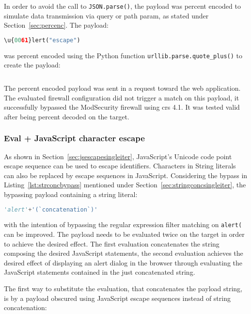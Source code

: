 In order to avoid the call to \verb|JSON.parse()|, the payload was percent encoded to simulate data transmission via query or path param, as stated under Section~\ref{sec:percenc}. The payload:

\begin{lstlisting}[style=basicStyle, escapeinside=\^\^, language=Python]
\u{0061}lert("escape")
\end{lstlisting}
was percent encoded using the Python function \verb|urllib.parse.quote_plus()| to create the payload:

\begin{lstlisting}[style=basicStyle, escapeinside=\^\^, language=Python, caption={\textbackslash u\{0061\}lert("escape") percent encoded bypass}]
%5Cu%7B0061%7Dlert%28%27escape%27%29
\end{lstlisting}
The percent encoded payload was sent in a request toward the web application. The evaluated firewall configuration did not trigger a match on this payload, it successfully bypassed the ModSecurity firewall using \acrshort{crs} 4.1. It was tested valid after being percent decoded on the target.

\subsubsection{Eval + JavaScript character escape}
\label{sec:jsescapemultiiter}
As shown in Section~\ref{sec:jsescapesingleiter}, JavaScript's Unicode code point escape sequence can be used to escape identifiers.
Characters in String literals can also be replaced by escape sequences in JavaScript. Considering the bypass in Listing~\ref{lst:strconcbypass} mentioned under Section~\ref{sec:stringconcsingleiter}, the bypassing payload containing a string literal:

\begin{lstlisting}[style=basicStyle, language=Python]
'alert'+'(`concatenation`)'
\end{lstlisting}
with the intention of bypassing the regular expression filter matching on \verb|alert(| can be improved. The payload needs to be evaluated twice on the target in order to achieve the desired effect. The first evaluation concatenates the string composing the desired JavaScript statements, the second evaluation achieves the desired effect of displaying an alert dialog in the browser through evaluating the JavaScript statements contained in the just concatenated string.

The first way to substitute the evaluation, that concatenates the payload string, is by a payload obscured using JavaScript escape sequences instead of string concatenation:

